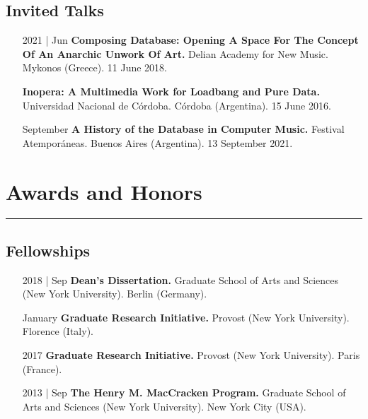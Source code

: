 \documentclass[12pt]{article}%
\begin{document}
\subsection{Invited Talks}%
\begin{itemize}[align=parleft,leftmargin=2.25cm,labelwidth=2cm]
\item[2021 | Jun]
\textbf{Composing Database: Opening A Space For The Concept Of An Anarchic Unwork Of Art.}
Delian Academy for New Music. 
Mykonos (Greece). 
11 June 2018.
\end{itemize}%
\begin{itemize}[align=parleft,leftmargin=2.25cm,labelwidth=2cm]
\item[]
\textbf{Inopera: A Multimedia Work for Loadbang and Pure Data.}
Universidad Nacional de Córdoba. 
Córdoba (Argentina). 
15 June 2016.
\end{itemize}%
\begin{itemize}[align=parleft,leftmargin=2.25cm,labelwidth=2cm]
\item[September]
\textbf{A History of the Database in Computer Music.}
Festival Atemporáneas. 
Buenos Aires (Argentina). 
13 September 2021.
\end{itemize}

%
\section{Awards and Honors}%
\label{sec:AwardsandHonors}%
\hrule%
\subsection{Fellowships}%
\begin{itemize}[align=parleft,leftmargin=2.25cm,labelwidth=2cm]
\item[2018 | Sep]
\textbf{Dean's Dissertation.}
Graduate School of Arts and Sciences (New York University). 
Berlin (Germany). 
\end{itemize}%
\begin{itemize}[align=parleft,leftmargin=2.25cm,labelwidth=2cm]
\item[January]
\textbf{Graduate Research Initiative.}
Provost (New York University). 
Florence (Italy). 
\end{itemize}%
\begin{itemize}[align=parleft,leftmargin=2.25cm,labelwidth=2cm]
\item[2017]
\textbf{Graduate Research Initiative.}
Provost (New York University). 
Paris (France). 
\end{itemize}%
\begin{itemize}[align=parleft,leftmargin=2.25cm,labelwidth=2cm]
\item[2013 | Sep]
\textbf{The Henry M. MacCracken Program.}
Graduate School of Arts and Sciences (New York University). 
New York City (USA). 
\end{itemize}%
\end{document}
